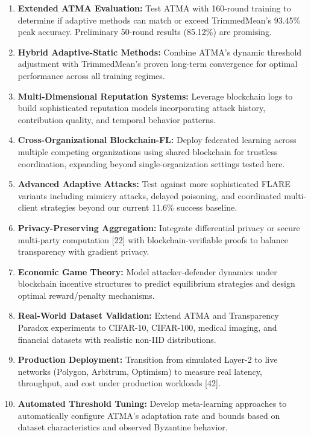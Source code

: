 \documentclass[12pt,a4paper,onecolumn]{article}
\begin{document}
\begin{enumerate}
    \item \textbf{Extended ATMA Evaluation:} Test ATMA with 160-round training to determine if adaptive methods can match or exceed TrimmedMean's 93.45\% peak accuracy. Preliminary 50-round results (85.12\%) are promising.
    
    \item \textbf{Hybrid Adaptive-Static Methods:} Combine ATMA's dynamic threshold adjustment with TrimmedMean's proven long-term convergence for optimal performance across all training regimes.
    
    \item \textbf{Multi-Dimensional Reputation Systems:} Leverage blockchain logs to build sophisticated reputation models incorporating attack history, contribution quality, and temporal behavior patterns.
    
    \item \textbf{Cross-Organizational Blockchain-FL:} Deploy federated learning across multiple competing organizations using shared blockchain for trustless coordination, expanding beyond single-organization settings tested here.
    
    \item \textbf{Advanced Adaptive Attacks:} Test against more sophisticated FLARE variants including mimicry attacks, delayed poisoning, and coordinated multi-client strategies beyond our current 11.6\% success baseline.
    
    \item \textbf{Privacy-Preserving Aggregation:} Integrate differential privacy or secure multi-party computation [22] with blockchain-verifiable proofs to balance transparency with gradient privacy.
    
    \item \textbf{Economic Game Theory:} Model attacker-defender dynamics under blockchain incentive structures to predict equilibrium strategies and design optimal reward/penalty mechanisms.
    
    \item \textbf{Real-World Dataset Validation:} Extend ATMA and Transparency Paradox experiments to CIFAR-10, CIFAR-100, medical imaging, and financial datasets with realistic non-IID distributions.
    
    \item \textbf{Production Deployment:} Transition from simulated Layer-2 to live networks (Polygon, Arbitrum, Optimism) to measure real latency, throughput, and cost under production workloads [42].
    
    \item \textbf{Automated Threshold Tuning:} Develop meta-learning approaches to automatically configure ATMA's adaptation rate and bounds based on dataset characteristics and observed Byzantine behavior.
\end{enumerate}
\end{document}
